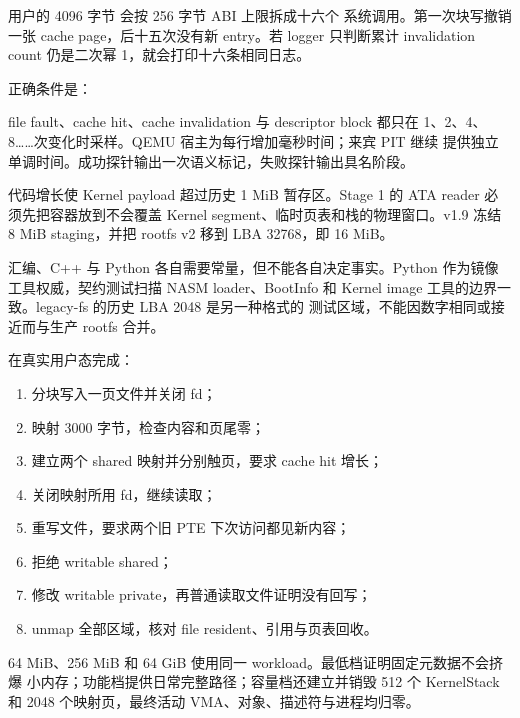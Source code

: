 用户的 4096 字节  会按 256 字节 ABI 上限拆成十六个
系统调用。第一次块写撤销一张 cache page，后十五次没有新 entry。若 logger
只判断累计 invalidation count 仍是二次幂 1，就会打印十六条相同日志。

正确条件是：

\begin{center}
\end{center}

file fault、cache hit、cache invalidation 与 descriptor block 都只在
1、2、4、8……次变化时采样。QEMU 宿主为每行增加毫秒时间；来宾 PIT 继续
提供独立单调时间。成功探针输出一次语义标记，失败探针输出具名阶段。

代码增长使 Kernel payload 超过历史 1 MiB 暂存区。Stage 1 的 ATA reader
必须先把容器放到不会覆盖 Kernel segment、临时页表和栈的物理窗口。v1.9
冻结 8 MiB  staging，并把 rootfs v2 移到
LBA 32768，即 16 MiB。

汇编、C++ 与 Python 各自需要常量，但不能各自决定事实。Python
 作为镜像工具权威，契约测试扫描 NASM loader、BootInfo
和 Kernel image 工具的边界一致。legacy-fs 的历史 LBA 2048 是另一种格式的
测试区域，不能因数字相同或接近而与生产 rootfs 合并。

 在真实用户态完成：

\begin{enumerate}[label=\arabic*.]
  \item 分块写入一页文件并关闭 fd；
  \item 映射 3000 字节，检查内容和页尾零；
  \item 建立两个 shared 映射并分别触页，要求 cache hit 增长；
  \item 关闭映射所用 fd，继续读取；
  \item 重写文件，要求两个旧 PTE 下次访问都见新内容；
  \item 拒绝 writable shared；
  \item 修改 writable private，再普通读取文件证明没有回写；
  \item unmap 全部区域，核对 file resident、引用与页表回收。
\end{enumerate}

64 MiB、256 MiB 和 64 GiB 使用同一 workload。最低档证明固定元数据不会挤爆
小内存；功能档提供日常完整路径；容量档还建立并销毁 512 个 KernelStack 和
2048 个映射页，最终活动 VMA、对象、描述符与进程均归零。

